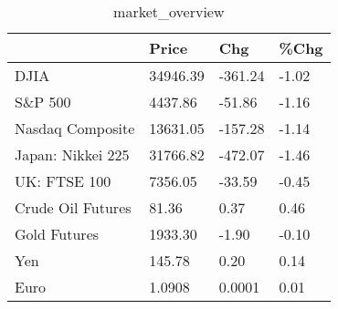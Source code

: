 \documentclass{article}%
\begin{document}
%


\begin{table}[htbp]%
\caption{market\_overview}%
\centering%
\begin{adjustbox}{width=1\textwidth}%
\begin{tabular}{llll}
\toprule
                  &    Price &     Chg &  \%Chg \\
\midrule
             DJIA & 34946.39 & -361.24 & -1.02 \\
          S\&P 500 &  4437.86 &  -51.86 & -1.16 \\
 Nasdaq Composite & 13631.05 & -157.28 & -1.14 \\
Japan: Nikkei 225 & 31766.82 & -472.07 & -1.46 \\
     UK: FTSE 100 &  7356.05 &  -33.59 & -0.45 \\
Crude Oil Futures &    81.36 &    0.37 &  0.46 \\
     Gold Futures &  1933.30 &   -1.90 & -0.10 \\
              Yen &   145.78 &    0.20 &  0.14 \\
             Euro &   1.0908 &  0.0001 &  0.01 \\
\bottomrule
\end{tabular}
%
\end{adjustbox}%
\end{table}

%
\end{document}
